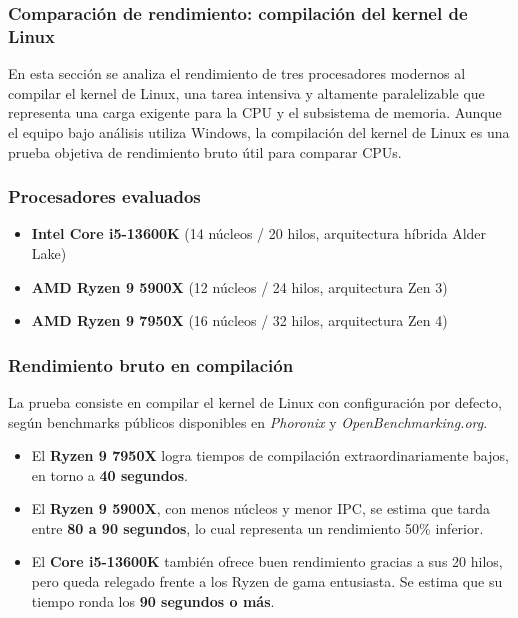 \subsubsection*{Comparación de rendimiento: compilación del kernel de Linux}

En esta sección se analiza el rendimiento de tres procesadores modernos al compilar el kernel de Linux, una tarea intensiva y altamente paralelizable que representa una carga exigente para la CPU y el subsistema de memoria. Aunque el equipo bajo análisis utiliza Windows, la compilación del kernel de Linux es una prueba objetiva de rendimiento bruto útil para comparar CPUs.

\subsubsection*{Procesadores evaluados}

\begin{itemize}
  \item \textbf{Intel Core i5-13600K} (14 núcleos / 20 hilos, arquitectura híbrida Alder Lake)
  \item \textbf{AMD Ryzen 9 5900X} (12 núcleos / 24 hilos, arquitectura Zen 3)
  \item \textbf{AMD Ryzen 9 7950X} (16 núcleos / 32 hilos, arquitectura Zen 4)
\end{itemize}

\subsubsection*{Rendimiento bruto en compilación}

La prueba consiste en compilar el kernel de Linux con configuración por defecto, según benchmarks públicos disponibles en \textit{Phoronix} y \textit{OpenBenchmarking.org}.

\begin{itemize}
  \item El \textbf{Ryzen 9 7950X} logra tiempos de compilación extraordinariamente bajos, en torno a \textbf{40 segundos}.
  \item El \textbf{Ryzen 9 5900X}, con menos núcleos y menor IPC, se estima que tarda entre \textbf{80 a 90 segundos}, lo cual representa un rendimiento 50\% inferior.
  \item El \textbf{Core i5-13600K} también ofrece buen rendimiento gracias a sus 20 hilos, pero queda relegado frente a los Ryzen de gama entusiasta. Se estima que su tiempo ronda los \textbf{90 segundos o más}.
\end{itemize}

